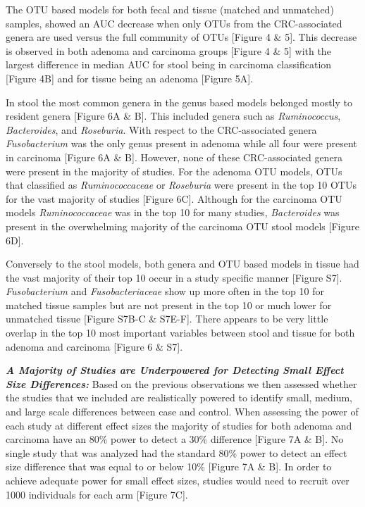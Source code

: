 \documentclass[12pt,]{article}
\begin{document}
The OTU based models for both fecal and tissue (matched and unmatched)
samples, showed an AUC decrease when only OTUs from the CRC-associated
genera are used versus the full community of OTUs {[}Figure 4 \& 5{]}.
This decrease is observed in both adenoma and carcinoma groups {[}Figure
4 \& 5{]} with the largest difference in median AUC for stool being in
carcinoma classification {[}Figure 4B{]} and for tissue being an adenoma
{[}Figure 5A{]}.

In stool the most common genera in the genus based models belonged
mostly to resident genera {[}Figure 6A \& B{]}. This included genera
such as \emph{Ruminococcus}, \emph{Bacteroides}, and \emph{Roseburia}.
With respect to the CRC-associated genera \emph{Fusobacterium} was the
only genus present in adenoma while all four were present in carcinoma
{[}Figure 6A \& B{]}. However, none of these CRC-associated genera were
present in the majority of studies. For the adenoma OTU models, OTUs
that classified as \emph{Ruminococcaceae} or \emph{Roseburia} were
present in the top 10 OTUs for the vast majority of studies {[}Figure
6C{]}. Although for the carcinoma OTU models \emph{Ruminococcaceae} was
in the top 10 for many studies, \emph{Bacteroides} was present in the
overwhelming majority of the carcinoma OTU stool models {[}Figure 6D{]}.

Conversely to the stool models, both genera and OTU based models in
tissue had the vast majority of their top 10 occur in a study specific
manner {[}Figure S7{]}. \emph{Fusobacterium} and \emph{Fusobacteriaceae}
show up more often in the top 10 for matched tissue samples but are not
present in the top 10 or much lower for unmatched tissue {[}Figure S7B-C
\& S7E-F{]}. There appears to be very little overlap in the top 10 most
important variables between stool and tissue for both adenoma and
carcinoma {[}Figure 6 \& S7{]}.

\textbf{\emph{A Majority of Studies are Underpowered for Detecting Small
Effect Size Differences:}} Based on the previous observations we then
assessed whether the studies that we included are realistically powered
to identify small, medium, and large scale differences between case and
control. When assessing the power of each study at different effect
sizes the majority of studies for both adenoma and carcinoma have an
80\% power to detect a 30\% difference {[}Figure 7A \& B{]}. No single
study that was analyzed had the standard 80\% power to detect an effect
size difference that was equal to or below 10\% {[}Figure 7A \& B{]}. In
order to achieve adequate power for small effect sizes, studies would
need to recruit over 1000 individuals for each arm {[}Figure 7C{]}.
\end{document}
